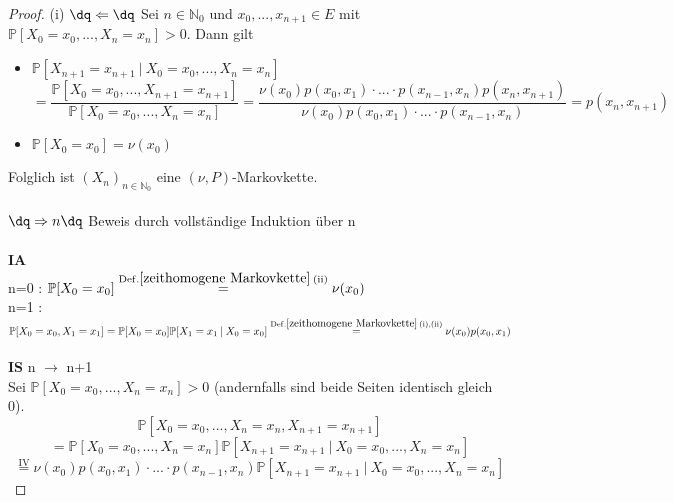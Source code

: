 \documentclass[a4paper,12pt]{scrartcl}
\theoremstyle{definition}
\begin{document}
\begin{proof}
(i) $\dq \Leftarrow \dq$ Sei $n \in \mathbb{N}_{0}$ und $x_{0},...,x_{n+1} \in E$ mit $\mathbb{P}[X_{0} = x_{0},...,X_{n} = x_{n}]>0$. Dann gilt
\begin{itemize}
\item $\mathbb{P}[X_{n+1} = x_{n+1} \: | \: X_{0} = x_{0},...,X_{n} = x_{n}]$
\begin{equation*}
=\dfrac{\mathbb{P}[X_{0} = x_{0},...,X_{n+1} = x_{n+1}]}{\mathbb{P}[X_{0} = x_{0},...,X_{n} = x_{n}]} = \dfrac{\nu(x_{0}) p(x_{0},x_{1}) \cdot ...\cdot p(x_{n-1},x_{n})p(x_{n},x_{n+1})}{\nu(x_{0}) p(x_{0},x_{1}) \cdot ...\cdot p(x_{n-1},x_{n})} = p(x_{n},x_{n+1})
\end{equation*}
\item $\mathbb{P}[X_{0} = x_{0}] = \nu(x_{0})$
\end{itemize}
Folglich ist ${(X_{n})}_{n \in \mathbb{N}_{0}}$ eine $(\nu,P)$-Markovkette.
\\
\\
$\dq \Rightarrow n\dq$ Beweis durch vollständige Induktion über  n
\\
\\
\textbf{IA}
\\
n=0 : $\mathbb{P}[X_{0} = x_{0}] \stackrel{\mathrm{Def.} \ref{zeithomogene Markovkette} \:        \mathrm{(ii)}}{=} \nu(x_{0})$
\\
n=1 : $\mathbb{P}[X_{0} = x_{0},X_{1} = x_{1}] = \mathbb{P}[X_{0} = x_{0}]\mathbb{P}[X_{1} = x_{1} \: | \: X_{0} = x_{0}]  \stackrel{\mathrm{Def.} \ref{zeithomogene Markovkette} \: \mathrm{(i),(ii)}}{=} \nu(x_{0})p(x_{0},x_{1})$
\\
\\
\textbf{IS} n $\to$ n+1
\\
Sei $\mathbb{P}[X_{0} = x_{0},...,X_{n} = x_{n}]>0$ (andernfalls sind beide Seiten identisch gleich 0).
\begin{equation*}
\mathbb{P}[X_{0} = x_{0},...,X_{n} = x_{n}, X_{n+1} = x_{n+1}]
\end{equation*}
\begin{equation*}
= \mathbb{P}[X_{0} = x_{0},...,X_{n} = x_{n}]\mathbb{P}[X_{n+1} = x_{n+1          }\: | \: X_{0} = x_{0},...,X_{n} = x_{n}]
\end{equation*}
\begin{equation*}
\stackrel{\mathrm{IV}}{=} \nu(x_{0}) p(x_{0},x_{1}) \cdot ...\cdot p(x_{n-1},x_{n})\mathbb{P}[X_{n+1} = x_{n+1}\: | \: X_{0} = x_{0},...,X_{n} = x_{n}]
\end{equation*}

\end{proof}
\end{document}
